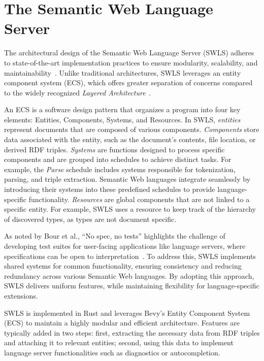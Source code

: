 \section{The Semantic Web Language Server}%
\label{sec:semantic_lsp}

The architectural design of the Semantic Web Language Server (SWLS) adheres to state-of-the-art implementation practices to ensure modularity, scalability, and maintainability~\cite{10.1145/3550355.3552452,10.1145/3563834.3567537,10.1145/3550355.3552452,Bour_2018}.
Unlike traditional architectures, SWLS leverages an entity component system (ECS), which offers greater separation of concerns compared to the widely recognized \textit{Layered Architecture}~\cite{10.1145/3550355.3552452}.

An ECS is a software design pattern that organizes a program into four key elements: Entities, Components, Systems, and Resources. 
In SWLS, \textit{entities} represent documents that are composed of various components. 
\textit{Components} store data associated with the entity, such as the document's contents, file location, or derived RDF triples. 
\textit{Systems} are functions designed to process specific components and are grouped into schedules to achieve distinct tasks. 
For example, the \textit{Parse} schedule includes systems responsible for tokenization, parsing, and triple extraction.
Semantic Web languages integrate seamlessly by introducing their systems into these predefined schedules to provide language-specific functionality.
\textit{Resources} are global components that are not linked to a specific entity.
For example, SWLS uses a resource to keep track of the hierarchy of discovered types, as types are not document specific.

As noted by Bour et al., ``No spec, no tests'' highlights the challenge of developing test suites for user-facing applications like language servers, where specifications can be open to interpretation~\cite{Bour_2018}. 
To address this, SWLS implements shared systems for common functionality, ensuring consistency and reducing redundancy across various Semantic Web languages.
By adopting this approach, SWLS delivers uniform features, while maintaining flexibility for language-specific extensions.

SWLS is implemented in Rust and leverages Bevy’s Entity Component System (ECS) to maintain a highly modular and efficient architecture.
Features are typically added in two steps:
  first, extracting the necessary data from RDF triples and attaching it to relevant entities; 
  second, using this data to implement language server functionalities such as diagnostics or autocompletion.

